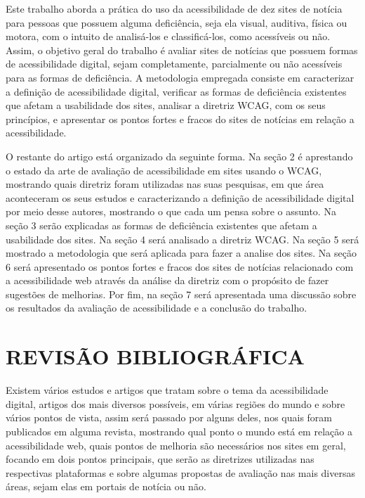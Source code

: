 \documentclass[a4paper]{article}
\begin{document}
\begin{titlepage}
Este trabalho aborda a prática do uso da acessibilidade de dez sites de notícia para pessoas que possuem alguma deficiência, seja ela visual, auditiva, física ou motora, com o intuito de analisá-los e classificá-los, como acessíveis ou não. Assim, o objetivo geral do trabalho é avaliar sites de notícias que possuem formas de acessibilidade digital, sejam completamente, parcialmente ou não acessíveis para as formas de deficiência.  A metodologia empregada consiste em caracterizar a definição de acessibilidade digital, verificar as formas de deficiência existentes que afetam a usabilidade dos sites, analisar a diretriz WCAG, com os seus princípios, e apresentar os pontos fortes e fracos do sites de notícias em relação a acessibilidade.

O restante do artigo está organizado da seguinte forma. Na seção 2 é aprestando o estado da arte de avaliação de acessibilidade em sites usando o WCAG, mostrando quais diretriz foram utilizadas nas suas pesquisas, em que área aconteceram os seus estudos e caracterizando a definição de acessibilidade digital por meio desse autores, mostrando o que cada um pensa sobre o assunto. Na seção 3 serão explicadas as formas de deficiência existentes que afetam a usabilidade dos sites. Na seção 4 será analisado a diretriz WCAG. Na seção 5 será mostrado a metodologia que será aplicada para fazer a analise dos sites. Na seção 6 será apresentado os pontos fortes e fracos dos sites de notícias relacionado com a acessibilidade web através da análise da diretriz com o propósito de fazer sugestões de melhorias. Por fim, na seção 7 será apresentada uma discussão sobre os resultados da avaliação de acessibilidade e a conclusão do trabalho.

\section{REVISÃO BIBLIOGRÁFICA}
Existem vários estudos e artigos que tratam sobre o tema da acessibilidade digital, artigos dos mais diversos possíveis, em várias regiões do mundo e sobre vários pontos de vista, assim será passado por alguns deles, nos quais foram publicados em alguma revista, mostrando qual ponto o mundo está em relação a acessibilidade web, quais pontos de melhoria são necessários nos sites em geral, focando em dois pontos principais, que serão as diretrizes utilizadas nas respectivas plataformas e sobre algumas propostas de avaliação nas mais diversas áreas, sejam elas em portais de notícia ou não.


\end{titlepage}
\end{document}
